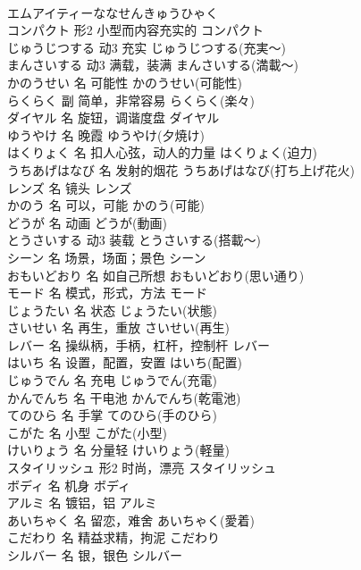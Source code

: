 \documentclass[8pt]{extreport}
\begin{document}
\begin{CJK}{UTF8}{min}
\\	エムアイティーななせんきゅうひゃく
\\	コンパクト	形2	小型而内容充实的	コンパクト	
\\	じゅうじつする	动3	充实	じゅうじつする(充実～)	
\\	まんさいする	动3	满载，装满	まんさいする(満載～)	
\\	かのうせい	名	可能性	かのうせい(可能性)	
\\	らくらく	副	简单，非常容易	らくらく(楽々)	
\\	ダイヤル	名	旋钮，调谐度盘	ダイヤル	
\\	ゆうやけ	名	晚霞	ゆうやけ(夕焼け)	
\\	はくりょく	名	扣人心弦，动人的力量	はくりょく(迫力)	
\\	うちあげはなび	名	发射的烟花	うちあげはなび(打ち上げ花火)	
\\	レンズ	名	镜头	レンズ	
\\	かのう	名	可以，可能	かのう(可能)	
\\	どうが	名	动画	どうが(動画)	
\\	とうさいする	动3	装载	とうさいする(搭載～)	
\\	シーン	名	场景，场面；景色	シーン	
\\	おもいどおり	名	如自己所想	おもいどおり(思い通り)	
\\	モード	名	模式，形式，方法	モード	
\\	じょうたい	名	状态	じょうたい(状態)	
\\	さいせい	名	再生，重放	さいせい(再生)	
\\	レバー	名	操纵柄，手柄，杠杆，控制杆	レバー	
\\	はいち	名	设置，配置，安置	はいち(配置)	
\\	じゅうでん	名	充电	じゅうでん(充電)	
\\	かんでんち	名	干电池	かんでんち(乾電池)	
\\	てのひら	名	手掌	てのひら(手のひら)	
\\	こがた	名	小型	こがた(小型)	
\\	けいりょう	名	分量轻	けいりょう(軽量)	
\\	スタイリッシュ	形2	时尚，漂亮	スタイリッシュ	
\\	ボディ	名	机身	ボディ	
\\	アルミ	名	镀铝，铝	アルミ	
\\	あいちゃく	名	留恋，难舍	あいちゃく(愛着)	
\\	こだわり	名	精益求精，拘泥	こだわり	
\\	シルバー	名	银，银色	シルバー	

\end{CJK}
\end{document}
